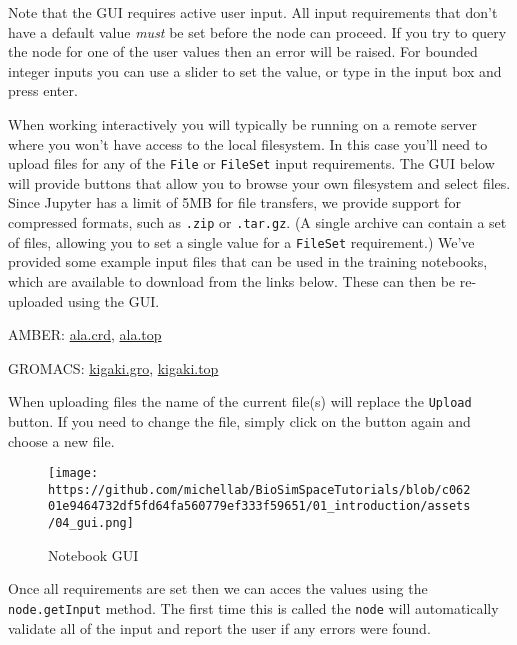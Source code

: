 Note that the GUI requires active user input. All input requirements
that don't have a default value \emph{must} be set before the node can
proceed. If you try to query the node for one of the user values then an
error will be raised. For bounded integer inputs you can use a slider to
set the value, or type in the input box and press enter.

When working interactively you will typically be running on a remote
server where you won't have access to the local filesystem. In this case
you'll need to upload files for any of the \texttt{File} or
\texttt{FileSet} input requirements. The GUI below will provide buttons
that allow you to browse your own filesystem and select files. Since
Jupyter has a limit of 5MB for file transfers, we provide support for
compressed formats, such as \texttt{.zip} or \texttt{.tar.gz}. (A single
archive can contain a set of files, allowing you to set a single value
for a \texttt{FileSet} requirement.) We've provided some example input
files that can be used in the training notebooks, which are available to
download from the links below. These can then be re-uploaded using the
GUI.

AMBER:
\href{https://raw.githubusercontent.com/michellab/BioSimSpace/devel/demo/amber/ala/ala.crd}{ala.crd},
\href{https://raw.githubusercontent.com/michellab/BioSimSpace/devel/demo/amber/ala/ala.top}{ala.top}

GROMACS:
\href{https://raw.githubusercontent.com/michellab/BioSimSpace/devel/demo/gromacs/kigaki/kigaki.gro}{kigaki.gro},
\href{https://raw.githubusercontent.com/michellab/BioSimSpace/devel/demo/gromacs/kigaki/kigaki.top}{kigaki.top}

When uploading files the name of the current file(s) will replace the
\texttt{Upload} button. If you need to change the file, simply click on
the button again and choose a new file.

\begin{Shaded}
\begin{Highlighting}[]
\end{Highlighting}
\end{Shaded}

\begin{figure}
\centering
\texttt{[image: https://github.com/michellab/BioSimSpaceTutorials/blob/c06201e9464732df5fd64fa560779ef333f59651/01\_introduction/assets/04\_gui.png]}
\caption{Notebook GUI}
\end{figure}

Once all requirements are set then we can acces the values using the
\texttt{node.getInput} method. The first time this is called the
\texttt{node} will automatically validate all of the input and report
the user if any errors were found.

